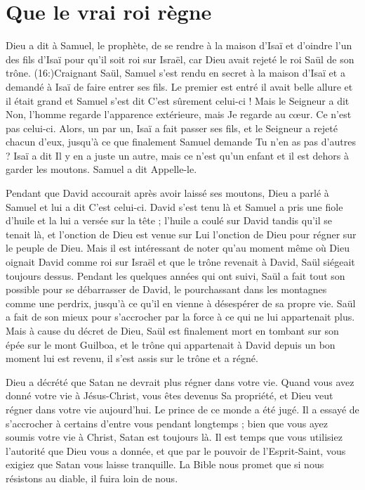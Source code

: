 \section{Que le vrai roi r\`egne}

Dieu a dit à Samuel, le prophète, de se rendre à la maison d'Isaï et d'oindre
 l'un des fils d'Isaï pour qu'il soit roi sur Israël,
 car Dieu avait rejeté le roi Saül de son trône.
 (16:)Craignant Saül,
 Samuel s'est rendu en secret à la maison d'Isaï
 et a demandé à Isaï de faire entrer ses fils.
 Le premier est entré \ocadr il avait belle allure et il était grand \fcadr{}
 et Samuel s'est dit\frcolon{} \Og C'est sûrement celui-ci ! \Fg{}
 Mais le Seigneur a dit\frcolon{} \Og Non, l'homme regarde l'apparence extérieure,
 mais Je regarde au cœur. Ce n'est pas celui-ci. \Fg{}
 Alors, un par un, Isaï a fait passer ses fils, et le Seigneur a rejeté
 chacun d'eux, jusqu'à ce que finalement Samuel demande\frcolon{}
 \Og Tu n'en as pas d'autres ? \Fg{}
 Isaï a dit\frcolon{} \Og Il y en a juste un autre, mais ce n'est qu'un enfant
 et il est dehors à garder les moutons. \Fg{}
 Samuel a dit\frcolon{} \Og Appelle-le. \Fg{}

Pendant que David accourait après avoir laissé ses moutons,
 Dieu a parlé à Samuel et lui a dit\frcolon{} \Og C'est celui-ci. \Fg{}
 David s'est tenu là et Samuel a pris une fiole d'huile
 et la lui a versée sur la tête ; l'huile a coulé sur David
 tandis qu'il se tenait là, et l'onction de Dieu est venue sur Lui
 \ocadr l'onction de Dieu pour régner sur le peuple de Dieu.
 Mais il est intéressant de noter qu'au moment même où Dieu
 oignait David comme roi
 sur Israël et que le trône revenait à David,
 Saül siégeait toujours dessus. Pendant les quelques années qui ont suivi,
 Saül a fait tout son possible pour se débarrasser de David,
 le pourchassant dans les montagnes comme une perdrix,
 jusqu'à ce qu'il en vienne à désespérer de sa propre vie.
 Saül a fait de son mieux pour s'accrocher par la force à ce qui
 ne lui appartenait plus. Mais à cause du décret de Dieu,
 Saül est finalement mort en tombant sur son épée sur le mont Guilboa,
 et le trône qui appartenait à David depuis un bon moment
 lui est revenu, il s'est assis sur le trône et a régné.

Dieu a décrété que Satan ne devrait plus régner dans votre vie.
 Quand vous avez donné votre vie à Jésus-Christ, vous êtes devenus
 Sa propriété, et Dieu veut régner dans votre vie aujourd'hui.
 Le prince de ce monde a été jugé. Il a essayé de s'accrocher à certains
 d'entre vous pendant longtemps ; bien que vous ayez soumis votre vie
 à Christ, Satan est toujours là. Il est temps que vous utilisiez
 l'autorité que Dieu vous a donnée, et que par le pouvoir de l'Esprit-Saint,
 vous exigiez que Satan vous laisse tranquille.
 La Bible nous promet que si nous résistons au diable,
 il fuira loin de nous.


